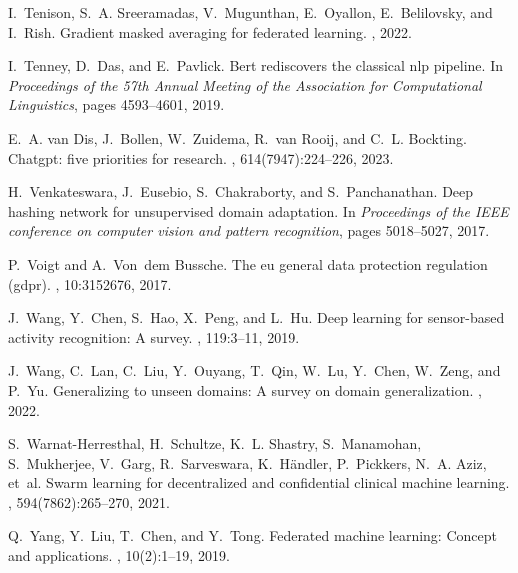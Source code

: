 \documentclass[11pt]{article}
\begin{document}
\begin{thebibliography}{10}
I.~Tenison, S.~A. Sreeramadas, V.~Mugunthan, E.~Oyallon, E.~Belilovsky, and
  I.~Rish.
\newblock Gradient masked averaging for federated learning.
, 2022.

I.~Tenney, D.~Das, and E.~Pavlick.
\newblock Bert rediscovers the classical nlp pipeline.
\newblock In {\em Proceedings of the 57th Annual Meeting of the Association for
  Computational Linguistics}, pages 4593--4601, 2019.

E.~A. van Dis, J.~Bollen, W.~Zuidema, R.~van Rooij, and C.~L. Bockting.
\newblock Chatgpt: five priorities for research.
, 614(7947):224--226, 2023.

H.~Venkateswara, J.~Eusebio, S.~Chakraborty, and S.~Panchanathan.
\newblock Deep hashing network for unsupervised domain adaptation.
\newblock In {\em Proceedings of the IEEE conference on computer vision and
  pattern recognition}, pages 5018--5027, 2017.

P.~Voigt and A.~Von~dem Bussche.
\newblock The eu general data protection regulation (gdpr).
, 10:3152676, 2017.

J.~Wang, Y.~Chen, S.~Hao, X.~Peng, and L.~Hu.
\newblock Deep learning for sensor-based activity recognition: A survey.
, 119:3--11, 2019.

J.~Wang, C.~Lan, C.~Liu, Y.~Ouyang, T.~Qin, W.~Lu, Y.~Chen, W.~Zeng, and P.~Yu.
\newblock Generalizing to unseen domains: A survey on domain generalization.
, 2022.

S.~Warnat-Herresthal, H.~Schultze, K.~L. Shastry, S.~Manamohan, S.~Mukherjee,
  V.~Garg, R.~Sarveswara, K.~H{\"a}ndler, P.~Pickkers, N.~A. Aziz, et~al.
\newblock Swarm learning for decentralized and confidential clinical machine
  learning.
, 594(7862):265--270, 2021.

Q.~Yang, Y.~Liu, T.~Chen, and Y.~Tong.
\newblock Federated machine learning: Concept and applications.
,
  10(2):1--19, 2019.


\end{thebibliography}
\end{document}
